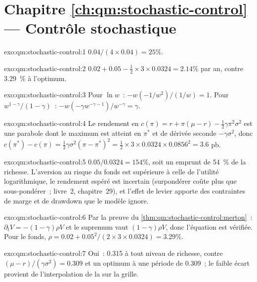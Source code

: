 \section*{Chapitre \ref{ch:qm:stochastic-control} --- Contrôle stochastique}

\begin{solution}{exo:qm:stochastic-control:1}
$0.04/(4 \times 0.04) = 25\%$.
\end{solution}

\begin{solution}{exo:qm:stochastic-control:2}
$0.02 + 0.05 - \tfrac12 \times 3 \times 0.0324 = 2.14\%$ par an, contre 3.29~\% à l'optimum.
\end{solution}

\begin{solution}{exo:qm:stochastic-control:3}
Pour $\ln w$~: $-w(-1/w^2)/(1/w) = 1$. Pour $w^{1-\gamma}/(1 - \gamma)$~: $-w(-\gamma w^{-\gamma-1})/w^{-\gamma} = \gamma$.
\end{solution}

\begin{solution}{exo:qm:stochastic-control:4}
Le rendement en  $c(\pi) = r + \pi(\mu - r) - \tfrac12\gamma\pi^2\sigma^2$ est une parabole dont le maximum est atteint en $\pi^*$ et
de dérivée seconde $-\gamma\sigma^2$, donc $c(\pi^*) - c(\pi) = \tfrac12\gamma\sigma^2(\pi - \pi^*)^2 = \tfrac12 \times 3 \times 0.0324 \times 0.0856^2 = 3.6$ pb.
\end{solution}

\begin{solution}{exo:qm:stochastic-control:5}
$0.05/0.0324 = 154\%$, soit un emprunt de 54~\% de la richesse. L'aversion au risque du fonds est supérieure à celle de l'utilité logarithmique, le
rendement espéré est incertain (surpondérer coûte plus que sous-pondérer~; livre~2, chapitre~29), et l'effet de levier apporte
des contraintes de marge et de drawdown que le modèle ignore.
\end{solution}

\begin{solution}{exo:qm:stochastic-control:6}
Par la preuve du \cref{thm:qm:stochastic-control:merton}~: $\partial_tV = -(1 - \gamma)\rho V$ et le supremum vaut $(1 - \gamma)\rho V$,
donc l'équation est vérifiée. Pour le fonds, $\rho = 0.02 + 0.05^2/(2 \times 3 \times 0.0324) = 3.29\%$.
\end{solution}

\begin{solution}{exo:qm:stochastic-control:7}
Oui~: 0.315 à tout niveau de richesse, contre $(\mu - r)/(\gamma\sigma^2) = 0.309$ et un optimum à une période de 0.309~; le faible écart
provient de l'interpolation de la  sur la grille.
\end{solution}

